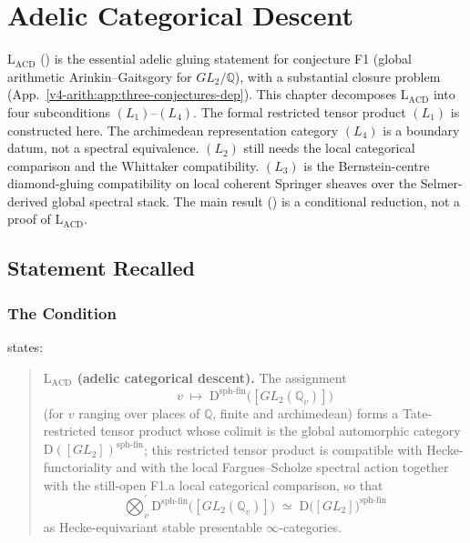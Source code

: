 \chapter{Adelic Categorical Descent}
\label{v4-arith:adelic-descent}

\(\mathrm{L}_{\mathrm{ACD}}\) ()
is the essential adelic gluing statement for conjecture F1 (global
arithmetic Arinkin--Gaitsgory for \(GL_{2}/\mathbb{Q}\)), with
a substantial closure problem
(App.~\ref{v4-arith:app:three-conjectures-dep}). This chapter decomposes
\(\mathrm{L}_{\mathrm{ACD}}\) into four subconditions
\((L_{1})\)--\((L_{4})\).  The formal restricted tensor product
\((L_{1})\) is constructed here.  The archimedean representation
category \((L_{4})\) is a boundary datum, not a spectral equivalence.
\((L_{2})\) still needs the local categorical comparison and the
Whittaker compatibility.  \((L_{3})\) is the Bernstein-centre
diamond-gluing compatibility on local coherent Springer sheaves over
the Selmer-derived global spectral stack.  The main result
() is a conditional reduction,
not a proof of \(\mathrm{L}_{\mathrm{ACD}}\).

\section{Statement Recalled}
\label{v4-arith:acd:statement}

\subsection{The Condition}

 states:

\begin{quote}
\textbf{\(\mathrm{L}_{\mathrm{ACD}}\) (adelic categorical descent).}
The assignment
\begin{equation}
\label{v4-arith:acd:eq:assignment}
v\;\longmapsto\;\mathrm{D}^{\mathrm{sph\text{-}fin}}\bigl([GL_{2}(\mathbb{Q}_{v})]\bigr)
\end{equation}
(for \(v\) ranging over places of \(\mathbb{Q}\), finite and archimedean)
forms a Tate-restricted tensor product whose colimit is the global
automorphic category
\(\mathrm{D}([GL_{2}])^{\mathrm{sph\text{-}fin}}\); this restricted
tensor product is compatible with Hecke-functoriality and with the
local Fargues--Scholze spectral action together with the still-open
F1.a local categorical comparison, so that
\begin{equation}
\label{v4-arith:acd:eq:target}
\bigotimes_{v}^{\prime}\mathrm{D}^{\mathrm{sph\text{-}fin}}\bigl([GL_{2}(\mathbb{Q}_{v})]\bigr)
\;\simeq\;
\mathrm{D}\bigl([GL_{2}]\bigr)^{\mathrm{sph\text{-}fin}}
\end{equation}
as Hecke-equivariant stable presentable \(\infty\)-categories.
\end{quote}

